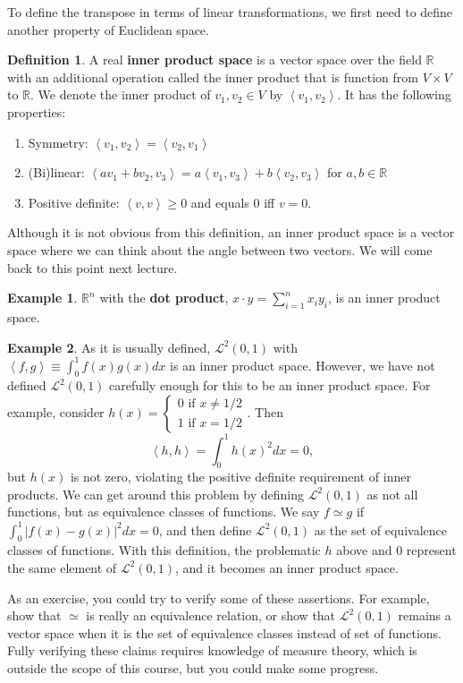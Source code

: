\documentclass[12pt,reqno]{amsart}
\def\R{\mathbb{R}}
\newcommand{\iprod}[2]{\left\langle {#1} , {#2} \right\rangle}
\theoremstyle{definition}
\newtheorem{definition}{Definition}[section]
\newtheorem{example}{Example}[section]
\begin{document}
To define the transpose in terms of linear transformations, we first
need to define another property of Euclidean space.
\begin{definition}
  A real \textbf{inner product space} is a vector space over the field
  $\R$ with an additional operation called the inner product that is
  function from $V \times V$ to $\mathbb{R}$. We denote the inner
  product of $v_1, v_2 \in V$ by $\iprod{v_1}{v_2}$. It has the
  following properties:
  \begin{enumerate}
  \item Symmetry: $\iprod{v_1}{v_2} = \iprod{v_2}{v_1}$
  \item (Bi)linear: $\iprod{a v_1 + b v_2}{v_3} = a \iprod{v_1}{v_3} + b
    \iprod{v_2}{v_3}$ for $a, b \in \R$
  \item Positive definite: $\iprod{v}{v} \geq 0$ and equals $0$ iff
    $v=0$. 
  \end{enumerate}  
\end{definition}
Although it is not obvious from this definition, an inner product
space is a vector space where we can think about the angle between two
vectors. We will come back to this point next lecture.
\begin{example}
  $\R^n$ with the \textbf{dot product}, $x \cdot y = \sum_{i=1}^n x_i
  y_i$, is an inner product space. 
\end{example}

\begin{example}
  As it is usually defined, $\mathcal{L}^2(0,1)$ with $\iprod{f}{g}
  \equiv \int_0^1 f(x) g(x) dx$ is an inner product space. However, we
  have not defined $\mathcal{L}^2(0,1)$ carefully enough for this to
  be an inner product space. For example, consider $h(x)
  = \begin{cases} 0 \text{ if } x \neq 1/2 \\
    1 \text{ if } x = 1/2
  \end{cases}$. Then 
  \[ 
  \iprod{h}{h} = \int_0^1 h(x)^2 dx = 0,
  \]
  but $h(x)$ is not zero, violating the positive definite requirement
  of inner products. We can get around this problem by defining
  $\mathcal{L}^2(0,1)$ as not all functions, but as equivalence
  classes of functions. We say $f \simeq g$ if $\int_0^1 |f(x) -
  g(x)|^2 dx = 0$, and then define $\mathcal{L}^2(0,1)$ as the set of
  equivalence classes of functions. With this definition, the
  problematic $h$ above and $0$ represent the same element of
  $\mathcal{L}^2(0,1)$, and it becomes an inner product space. 

  As an exercise, you could try to verify some of these
  assertions. For example, show that $\simeq$ is really an equivalence
  relation, or show that $\mathcal{L}^2(0,1)$ remains a vector space
  when it is the set of equivalence classes instead of set of
  functions. Fully verifying these claims requires knowledge of
  measure theory, which is outside the scope of this course, but you
  could make some progress.
\end{example}
\end{document}
